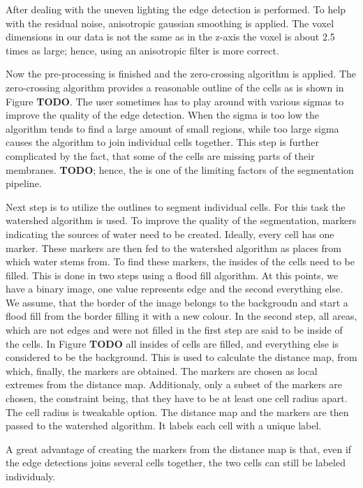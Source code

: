 \documentclass[
  digital,     %
  oneside,     %
  nosansbold,  %
  nocolorbold, %
  lof,         %
  lot,         %
]{fithesis4}
\begin{document}
After dealing with the uneven lighting the edge detection is performed. To help
with the residual noise, anisotropic gaussian smoothing is applied. The voxel
dimensions in our data is not the same as in the z-axis the voxel is about 2.5
times as large; hence, using an anisotropic filter is more correct. 

Now the pre-processing is finished and the zero-crossing algorithm is applied.
The zero-crossing algorithm provides a reasonable outline of the cells as is
shown in Figure \textbf{TODO}. The user sometimes has to play around with
various sigmas to improve the quality of the edge detection. When the sigma is
too low the algorithm tends to find a large amount of small regions, while too
large sigma causes the algorithm to join individual cells together. This step
is further complicated by the fact, that some of the cells are missing parts of
their membranes. \textbf{TODO}; hence, the is one of the limiting factors of
the segmentation pipeline.

Next step is to utilize the outlines to segment individual cells. For this task
the watershed algorithm is used. To improve the quality of the segmentation,
markers indicating the sources of water need to be created. Ideally, every cell
has one marker. These markers are then fed to the watershed algorithm as places
from which water stems from. To find these markers, the insides of the cells
need to be filled. This is done in two steps using a flood fill algorithm. At
this points, we have a binary image, one value represents edge and the second
everything else. We assume, that the border of the image belongs to the
backgroudn and start a flood fill from the border filling it with a new colour. In
the second step, all areas, which are not edges and were not filled in the first
step are said to be inside of the cells. In Figure \textbf{TODO} all insides of
cells are filled, and everything else is considered to be the background. This
is used to calculate the distance map, from which, finally, the markers are
obtained. The markers are chosen as local extremes from the distance map.
Additionaly, only a subset of the markers are chosen, the constraint being,
that they have to be at least one cell radius apart. The cell radius is
tweakable option. The distance map and the markers are then passed to the
watershed algorithm. It labels each cell with a unique label.

A great advantage of creating the markers from the distance map is that, even if
the edge detections joins several cells together, the two cells can still be
labeled individualy.
\end{document}
